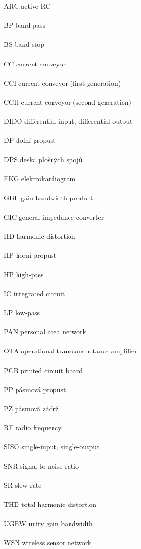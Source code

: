 ARC \hfill active RC \\ \\
BP \hfill band-pass \\ \\
BS \hfill band-stop \\ \\
CC \hfill current conveyor \\ \\
CCI \hfill current conveyor (first generation) \\ \\
CCII \hfill current conveyor (second generation) \\ \\
DIDO \hfill differential-input, differential-output \\ \\
DP \hfill dolní propust \\ \\
DPS \hfill deska plošných spojů \\ \\
EKG \hfill elektrokardiogram \\ \\
GBP \hfill gain bandwidth product \\ \\
GIC \hfill general impedance converter \\ \\
HD \hfill harmonic distortion \\ \\
HP \hfill horní propust \\ \\
HP \hfill high-pass \\ \\
IC \hfill integrated circuit \\ \\
LP \hfill low-pass \\ \\
PAN \hfill personal area network \\ \\
OTA \hfill operational transconductance amplifier \\ \\
PCB \hfill printed circuit board \\ \\
PP \hfill pásmová propust \\ \\
PZ \hfill pásmová zádrž \\ \\
RF \hfill radio frequency \\ \\
SISO \hfill single-input, single-output \\ \\
SNR \hfill signal-to-noise ratio \\ \\
SR \hfill slew rate \\ \\
THD \hfill total harmonic distortion \\ \\
UGBW \hfill unity gain bandwidth \\ \\
WSN \hfill wireless sensor network
